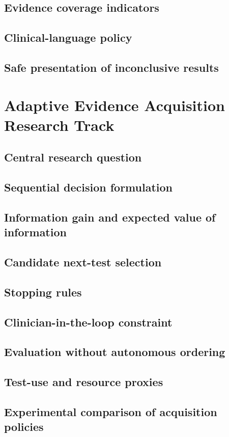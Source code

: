 \documentclass[11pt,journal,onecolumn,draftclsnofoot]{IEEEtran}
\begin{document}
\subsection{Evidence coverage indicators}
\subsection{Clinical-language policy}
\subsection{Safe presentation of inconclusive results}

\section{Adaptive Evidence Acquisition Research Track}
\subsection{Central research question}
\subsection{Sequential decision formulation}
\subsection{Information gain and expected value of information}
\subsection{Candidate next-test selection}
\subsection{Stopping rules}
\subsection{Clinician-in-the-loop constraint}
\subsection{Evaluation without autonomous ordering}
\subsection{Test-use and resource proxies}
\subsection{Experimental comparison of acquisition policies}
\end{document}
